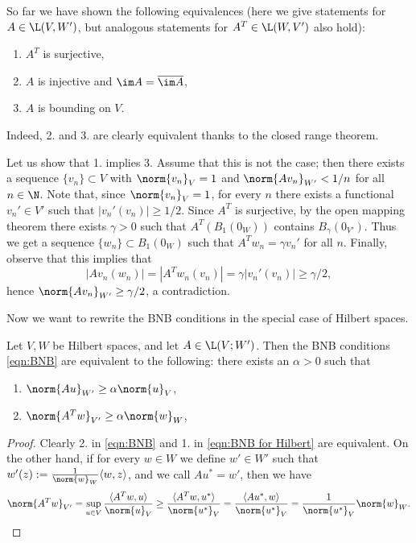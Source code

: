 So far we have shown the following equivalences (here we give statements for $A\in\L(V,W')$, but analogous statements for $A^T\in\L(W,V')$ also hold):
\begin{enumerate}
    \item $A^T$ is surjective,
    \item $A$ is injective and $\im A=\overline{\im A}$,
    \item $A$ is bounding on $V$.
\end{enumerate}
Indeed, 2. and 3. are clearly equivalent thanks to the closed range theorem.\par
Let us show that 1. implies 3. Assume that this is not the case; then there exists a sequence $\{v_n\}\subset V$ with $\norm{v_n}_{V}=1$ and $\norm{Av_n}_{W'}<1/n$ for all $n\in\N$. Note that, since $\norm{v_n}_{V}=1$, for every $n$ there exists a functional $v_n'\in V'$ such that $|v_n'(v_n)|\geq 1/2$. Since $A^T$ is surjective, by the open mapping theorem there exists $\gamma > 0$ such that $A^T(B_1(0_W))$ contains $B_\gamma(0_{V'})$. Thus we get a sequence $\{w_n\}\subset B_1(0_W)$ such that $A^Tw_n=\gamma v_n'$ for all $n$. Finally, observe that this implies that
\begin{equation*}
    |Av_n(w_n)|=|A^Tw_n(v_n)|=\gamma|v_n'(v_n)|\geq\gamma/2,
\end{equation*}
hence $\norm{Av_n}_{W'}\geq\gamma/2$, a contradiction.\par
{}
Now we want to rewrite the BNB conditions in the special case of Hilbert spaces.
\begin{lemma}\label{eqn:BNB for Hilbert}
    Let $V,W$ be Hilbert spaces, and let $A\in\L(V;W')$. Then the BNB conditions \eqref{eqn:BNB} are equivalent to the following: there exists an $\alpha>0$ such that
    \begin{enumerate}
        \item $\norm{Au}_{W'}\geq\alpha\norm{u}_V$,
        \item $\norm{A^Tw}_{V'}\geq\alpha\norm{w}_W$,
    \end{enumerate}
\end{lemma}
\begin{proof}
    Clearly 2. in \eqref{eqn:BNB} and 1. in \eqref{eqn:BNB for Hilbert} are equivalent. On the other hand, if for every $w\in W$ we define $w'\in W'$ such that $w'(z):=\tfrac{1}{\norm{w}_W}\langle w,z \rangle$, and we call $Au^*=w'$, then we have
    \begin{equation*}
        \norm{A^Tw}_{V'}=\sup_{u\in V}\frac{\langle A^Tw,u \rangle}{\norm{u}_V}\geq\frac{\langle A^Tw,u^* \rangle}{\norm{u^*}_V}=\frac{\langle Au^*,w \rangle}{\norm{u^*}_V}=\frac{1}{\norm{u^*}_V}\norm{w}_W.
    \end{equation*}
\end{proof}
